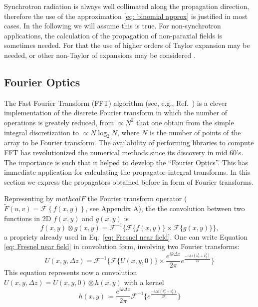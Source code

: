 \documentclass{iucr}              %
\begin{document}
Synchrotron radiation is always well collimated along the propagation direction, therefore the use of the approximation \ref{eq: binomial approx} is justified in most cases. In the following we will assume this is true. For non-synchrotron applications, the calculation of the propagation of non-paraxial fields is sometimes needed. For that the use of higher orders of Taylor expansion may be needed, or other non-Taylor of expansions may be considered \cite{Mansuripur,Avoort}.


%
%



\subsection{Fourier Optics}

The Fast Fourier Transform (FFT) algorithm (see, e.g., Ref.~\cite{10.2307/2003354}) is a clever implementation of the discrete Fourier transform in which the number of operations is greately reduced, from $\propto N^2$ that one obtain from the simple integral discretization to $\propto N \log_2 N$, where $N$ is the number of points of the array to be Fourier transform. The availability of performing libraries to compute FFT has revolutionized the numerical methods since its discovery in mid 60's. The importance is such that it helped to develop the ``Fourier Optics''. This has immediate application for calculating the propagator integral transforms. In this section we express the propagators obtained before in form of Fourier transforms. 

Representing by $mathcal{F}$ the Fourier transform operator ($\tilde{F}(u,v)=\mathcal{F}\left\{ f(x,y) \right\}$, see Appendix A), the the convolution between two functions in 2D $f(x,y)$ and $g(x,y)$ is
\begin{equation}\label{eq: definition of convolution}
f(x,y) \otimes g(x,y) = \mathcal{F}^{-1}\big\{{\mathcal{F}\{f(x,y)\} \times \mathcal{F}\{g(x,y)\}} \big\},
\end{equation}
a propriety already used in Eq.~\ref{eq: Fresnel near field}. One can write Equation \ref{eq: Fresnel near field}  in convolution form, involving two Fourier transforms:
\begin{equation}\label{eq: ft near field}
U(x, y, \Delta z) = \mathcal{F}^{-1}\Big\{ \mathcal{F}\{U(x, y, 0)\} \times \frac{e^{i k \Delta z}}{2\pi} e^{\frac{-i \Delta z (k_x^2 + k_y^2) }{2k}} \Big\} \end{equation} 
This equation represents now a convolution $U(x, y, \Delta z) =U(x, y, 0) \otimes h(x,y)$ with a kernel
\begin{equation}\label{eq: fresnel kernel}
h(x,y) \coloneqq \frac{e^{i k \Delta z}}{2\pi} \mathcal{F}^{-1}\Big \{e^{\frac{-i \Delta z (k_x^2 + k_y^2) }{2k}}\Big\}
\end{equation} 
\end{document}
